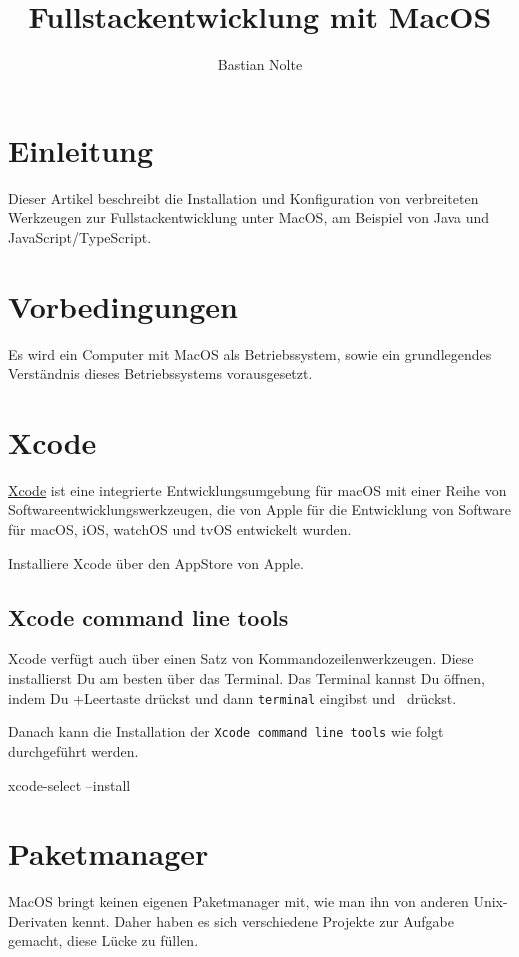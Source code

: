 \documentclass[]{article}
\title{Fullstackentwicklung mit MacOS}
\author{Bastian Nolte}
\newcommand{\code}[1]{\texttt{#1}}
\begin{document}
\maketitle
\section{Einleitung}
Dieser Artikel beschreibt die Installation und Konfiguration von verbreiteten Werkzeugen zur Fullstackentwicklung unter MacOS, am Beispiel von Java und JavaScript/TypeScript.

\section{Vorbedingungen}
Es wird ein Computer mit MacOS als Betriebssystem, sowie ein grundlegendes Verständnis dieses Betriebssystems vorausgesetzt.

\begingroup
\parskip=0pt
\tableofcontents
\endgroup

\section{Xcode}
\href{https://developer.apple.com/xcode/}{Xcode} ist eine integrierte Entwicklungsumgebung für macOS mit einer Reihe von Softwareentwicklungswerkzeugen, die von Apple für die Entwicklung von Software für macOS, iOS, watchOS und tvOS entwickelt wurden.

Installiere Xcode über den AppStore von Apple.
\subsection{Xcode command line tools}
Xcode verfügt auch über einen Satz von Kommandozeilenwerkzeugen. Diese installierst Du am besten über das Terminal. Das Terminal kannst Du öffnen, indem Du \cmdkey+Leertaste drückst und dann \code{terminal} eingibst und \returnkey\, drückst.

Danach kann die Installation der \code{Xcode  command line tools} wie folgt durchgeführt werden.
\begin{bashcode}
xcode-select --install
\end{bashcode}

\section{Paketmanager}
MacOS bringt keinen eigenen Paketmanager mit, wie man ihn von anderen Unix-Derivaten kennt. Daher haben es sich verschiedene Projekte zur Aufgabe gemacht, diese Lücke zu füllen.
\end{document}
